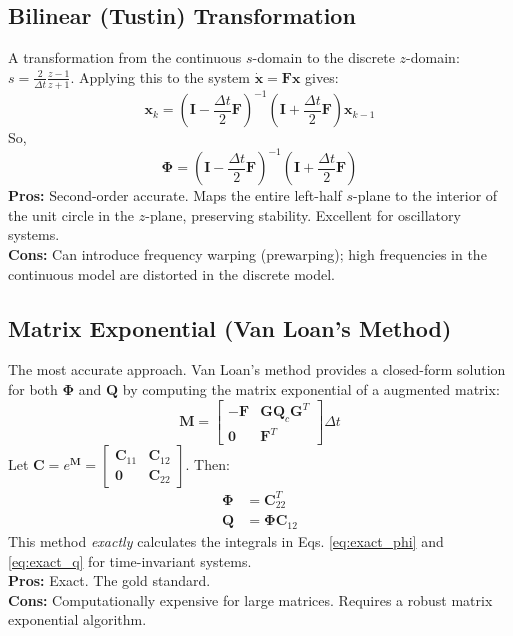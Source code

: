 \documentclass[11pt]{article}
\begin{document}
\subsection{Bilinear (Tustin) Transformation}
A transformation from the continuous $s$-domain to the discrete $z$-domain: $s = \frac{2}{\Delta t} \frac{z - 1}{z + 1}$. Applying this to the system $\dot{\bm{x}} = \bm{F} \bm{x}$ gives:
\begin{equation}
\bm{x}_k = \left( \bm{I} - \frac{\Delta t}{2} \bm{F} \right)^{-1} \left( \bm{I} + \frac{\Delta t}{2} \bm{F} \right) \bm{x}_{k-1}
\end{equation}
So,
\begin{equation}
\bm{\Phi} = \left( \bm{I} - \frac{\Delta t}{2} \bm{F} \right)^{-1} \left( \bm{I} + \frac{\Delta t}{2} \bm{F} \right)
\end{equation}
\textbf{Pros:} Second-order accurate. Maps the entire left-half $s$-plane to the interior of the unit circle in the $z$-plane, preserving stability. Excellent for oscillatory systems. \\
\textbf{Cons:} Can introduce frequency warping (prewarping); high frequencies in the continuous model are distorted in the discrete model.

\subsection{Matrix Exponential (Van Loan's Method)}
The most accurate approach. Van Loan's method provides a closed-form solution for both $\bm{\Phi}$ and $\bm{Q}$ by computing the matrix exponential of a augmented matrix:
\begin{equation}
\bm{M} = \begin{bmatrix}
-\bm{F} & \bm{G} \bm{Q}_c \bm{G}^T \\
\bm{0} & \bm{F}^T
\end{bmatrix} \Delta t
\end{equation}
Let $\bm{C} = e^{\bm{M}} = \begin{bmatrix} \bm{C}_{11} & \bm{C}_{12} \\ \bm{0} & \bm{C}_{22} \end{bmatrix}$. Then:
\begin{align}
\bm{\Phi} &= \bm{C}_{22}^T \\
\bm{Q} &= \bm{\Phi} \bm{C}_{12}
\end{align}
This method \textit{exactly} calculates the integrals in Eqs. \ref{eq:exact_phi} and \ref{eq:exact_q} for time-invariant systems. \\
\textbf{Pros:} Exact. The gold standard. \\
\textbf{Cons:} Computationally expensive for large matrices. Requires a robust matrix exponential algorithm.
\end{document}
